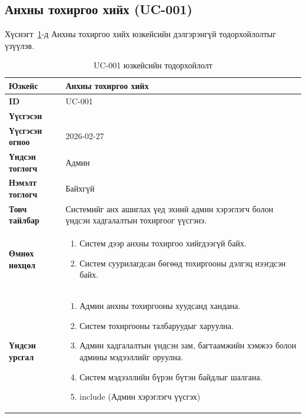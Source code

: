 \newcommand{\usecasecreatedby}{\shortname}
\newcommand{\usecasecreateddateearly}{2026-02-27}
\newcommand{\usecasecreateddatelate}{2026-03-12}

\subsection{Анхны тохиргоо хийх (UC-001)}

Хүснэгт~\ref{tab:uc-001}-д Анхны тохиргоо хийх юзкейсийн дэлгэрэнгүй тодорхойлолтыг үзүүлэв.

\begin{table}[H]
    \centering
    \renewcommand{\arraystretch}{1.3}
    \caption{UC-001 юзкейсийн тодорхойлолт}
    \label{tab:uc-001}
    \begin{tabular}{|p{3.8cm}|p{10.2cm}|}
        \hline
        \textbf{Юзкейс} & Анхны тохиргоо хийх \\ \hline
        \textbf{ID} & UC-001 \\ \hline
        \textbf{Үүсгэсэн} & \usecasecreatedby \\ \hline
        \textbf{Үүсгэсэн огноо} & \usecasecreateddateearly \\ \hline
        \textbf{Үндсэн тоглогч} & Админ \\ \hline
        \textbf{Нэмэлт тоглогч} & Байхгүй \\ \hline
        \textbf{Товч тайлбар} & Системийг анх ашиглах үед эхний админ хэрэглэгч болон үндсэн хадгалалтын тохиргоог үүсгэнэ. \\ \hline
        \textbf{Өмнөх нөхцөл} &
        \begin{enumerate}
            \item Систем дээр анхны тохиргоо хийгдээгүй байх.
            \item Систем суурилагдсан бөгөөд тохиргооны дэлгэц нээгдсэн байх.
        \end{enumerate}
        \\ \hline
        \textbf{Үндсэн урсгал} &
        \begin{enumerate}
            \item Админ анхны тохиргооны хуудсанд хандана.
            \item Систем тохиргооны талбаруудыг харуулна.
            \item Админ хадгалалтын үндсэн зам, багтаамжийн хэмжээ болон админы мэдээллийг оруулна.
            \item Систем мэдээллийн бүрэн бүтэн байдлыг шалгана.
            \item include (Админ хэрэглэгч үүсгэх)

\end{enumerate}
\end{tabular}
\end{table}
